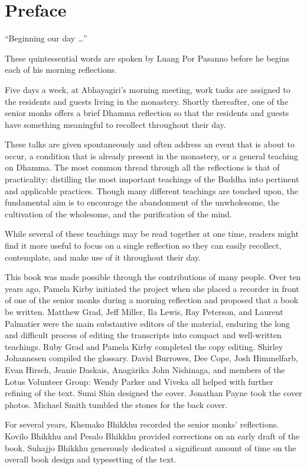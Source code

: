 \chapter{Preface}

``Beginning our day \ldots{}''

These quintessential words are spoken by Luang Por Pasanno before he 
begins each of his morning reflections.

Five days a week, at Abhayagiri's morning meeting, work tasks are 
assigned to the residents and guests living in the monastery. Shortly 
thereafter, one of the senior monks offers a brief Dhamma reflection so 
that the residents and guests have something meaningful to recollect 
throughout their day.

These talks are given spontaneously and often address an event that is 
about to occur, a condition that is already present in the monastery, 
or a general teaching on Dhamma. The most common thread through all the 
reflections is that of practicality: distilling the most important 
teachings of the Buddha into pertinent and applicable practices. Though 
many different teachings are touched upon, the fundamental aim is to 
encourage the abandonment of the unwholesome, the cultivation of the 
wholesome, and the purification of the mind.

While several of these teachings may be read together at one time, 
readers might find it more useful to focus on a single reflection so 
they can easily recollect, contemplate, and make use of it throughout 
their day.

This book was made possible through the contributions of many people. 
Over ten years ago, Pamela Kirby initiated the project when she placed 
a recorder in front of one of the senior monks during a morning 
reflection and proposed that a book be written. Matthew Grad, Jeff 
Miller, Ila Lewis, Ray Peterson, and Laurent Palmatier were the main 
substantive editors of the material, enduring the long and difficult 
process of editing the transcripts into compact and well-written 
teachings. Ruby Grad and Pamela Kirby completed the copy editing. 
Shirley Johannesen compiled the glossary. David Burrowes, Dee Cope, 
Josh Himmelfarb, Evan Hirsch, Jeanie Daskais, Anagārika John 
Nishinaga, and members of the Lotus Volunteer Group: Wendy Parker and 
Viveka all helped with further refining of the text. Sumi Shin designed 
the cover. Jonathan Payne took the cover photos. Michael Smith tumbled 
the stones for the back cover.

For several years, Khemako Bhikkhu recorded the senior monks' 
reflections. Kovilo Bhikkhu and Pesalo Bhikkhu provided corrections on 
an early draft of the book. Suhajjo Bhikkhu generously dedicated a 
significant amount of time on the overall book design and typesetting 
of the text.

